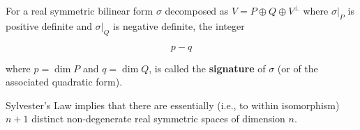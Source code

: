 For a real symmetric bilinear form $\sigma$ decomposed as $V = P \oplus Q \oplus V^\perp$ where $\sigma|_P$ is positive definite and $\sigma|_Q$ is negative definite, the integer

$$p - q$$

where $p = \dim P$ and $q = \dim Q$, is called the \textbf{signature} of $\sigma$ (or of the associated quadratic form).

Sylvester's Law implies that there are essentially (i.e., to within isomorphism) $n+1$ distinct non-degenerate real symmetric spaces of dimension $n$.
